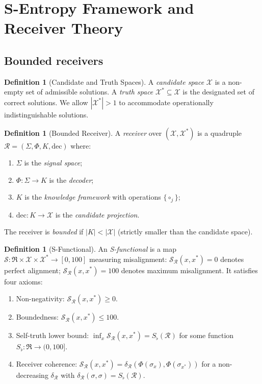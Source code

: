 \documentclass[twocolumn,10pt,a4paper]{article}
\theoremstyle{thmstyle}
\theoremstyle{definition}
\newtheorem{definition}[theorem]{Definition}
\theoremstyle{remark}
\newcommand{\Sfl}{S_{\flat}}
\newcommand{\receiver}{\mathcal{R}}
\begin{document}
\section{S-Entropy Framework and Receiver Theory}
\label{sec:receiver}

\subsection{Bounded receivers}

\begin{definition}[Candidate and Truth Spaces]
A \emph{candidate space} $\mathcal{X}$ is a non-empty set of admissible
solutions. A \emph{truth space} $\mathcal{X}^* \subseteq \mathcal{X}$
is the designated set of correct solutions. We allow $|\mathcal{X}^*| > 1$
to accommodate operationally indistinguishable solutions.
\end{definition}

\begin{definition}[Bounded Receiver]
\label{def:receiver}
A \emph{receiver} over $(\mathcal{X}, \mathcal{X}^*)$ is a quadruple
$\receiver = (\Sigma, \Phi, K, \mathrm{dec})$ where:
\begin{enumerate}[nosep,label=(\roman*)]
\item $\Sigma$ is the \emph{signal space};
\item $\Phi : \Sigma \to K$ is the \emph{decoder};
\item $K$ is the \emph{knowledge framework} with operations $\{\circ_j\}$;
\item $\mathrm{dec} : K \to \mathcal{X}$ is the \emph{candidate projection}.
\end{enumerate}
The receiver is \emph{bounded} if $|K| < |\mathcal{X}|$ (strictly smaller
than the candidate space).
\end{definition}

\begin{definition}[S-Functional]
\label{def:s_functional}
An \emph{S-functional} is a map
$\mathcal{S} : \mathfrak{R} \times \mathcal{X} \times \mathcal{X}^*
\to [0, 100]$
measuring misalignment: $\mathcal{S}_\receiver(x, x^*) = 0$ denotes perfect
alignment; $\mathcal{S}_\receiver(x, x^*) = 100$ denotes maximum misalignment.
It satisfies four axioms:
\begin{enumerate}[nosep,label=(S\arabic*)]
\item Non-negativity: $\mathcal{S}_\receiver(x,x^*) \geq 0$.
\item Boundedness: $\mathcal{S}_\receiver(x,x^*) \leq 100$.
\item Self-truth lower bound: $\inf_x \mathcal{S}_\receiver(x,x^*) = \Sfl(\receiver)$
for some function $\Sfl : \mathfrak{R} \to (0,100]$.
\item Receiver coherence: $\mathcal{S}_\receiver(x,x^*)
= \delta_\receiver(\Phi(\sigma_x), \Phi(\sigma_{x^*}))$
for a non-decreasing $\delta_\receiver$ with $\delta_\receiver(\sigma,\sigma) = \Sfl(\receiver)$.
\end{enumerate}
\end{definition}
\end{document}
